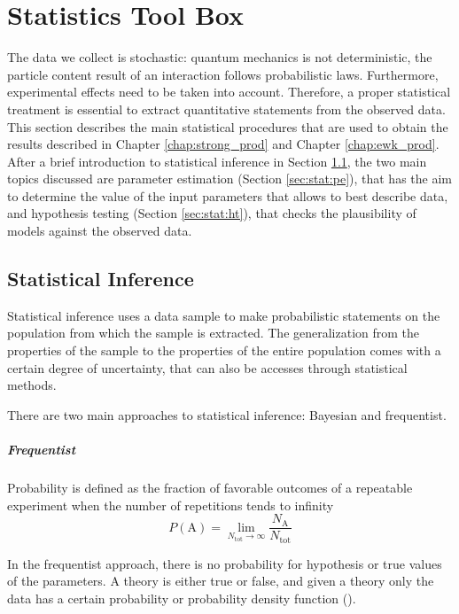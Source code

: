 \chapter{Statistics Tool Box}
\label{chap:stat}

The data we collect is stochastic: quantum mechanics is not deterministic, the particle content result of an interaction follows probabilistic laws. Furthermore, experimental effects need to be taken into account. Therefore, a proper statistical treatment is essential to extract quantitative statements from the observed data. This section describes the main statistical procedures that are used to obtain the results described in Chapter \ref{chap:strong_prod} and Chapter \ref{chap:ewk_prod}. After a brief introduction to statistical inference in Section \ref{sec:stat:intro}, the two main topics discussed are parameter estimation (Section \ref{sec:stat:pe}), that has the aim to determine the value of the input parameters that allows to best describe data, and hypothesis testing (Section \ref{sec:stat:ht}), that checks the plausibility of models against the observed data.

\section{Statistical Inference}
\label{sec:stat:intro}

Statistical inference uses a data sample to make probabilistic statements on the population from which the sample is extracted. The generalization from the properties of the sample to the properties of the entire population comes with a certain degree of uncertainty, that can also be accesses through statistical methods.

There are two main approaches to statistical inference: Bayesian and frequentist.

\paragraph{Frequentist}

Probability is defined as the fraction of favorable outcomes of a repeatable experiment when the number of repetitions tends to infinity 
\begin{equation}
P(\mathrm{A}) = \lim_{N_{\mathrm{tot}} \rightarrow \infty} \frac{N_\mathrm{A}}{N_{\mathrm{tot}}}
\end{equation}

In the frequentist approach, there is no probability for hypothesis or true values of the parameters. A theory is either true or false, and given a theory only the data has a certain probability or probability density function (\pdf).

